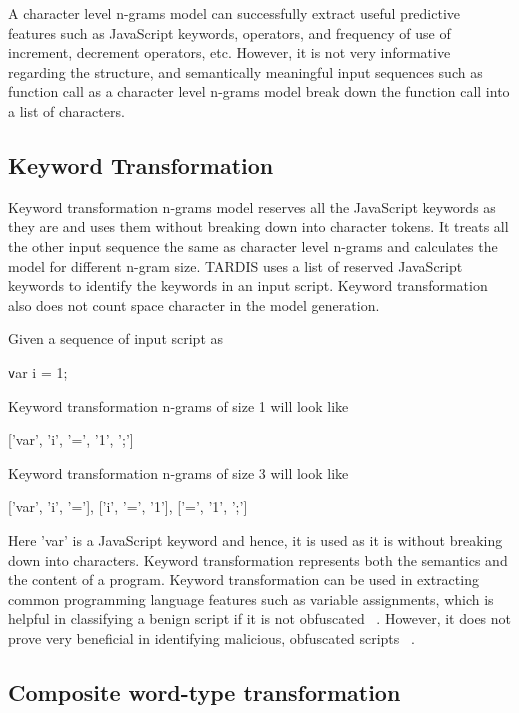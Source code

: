 A character level n-grams model can successfully extract useful predictive features such as JavaScript keywords, operators, and frequency of use of increment, decrement operators, etc. However, it is not very informative regarding the structure, and semantically meaningful input sequences such as function call as a character level n-grams model break down the function call into a list of characters.

\subsection{Keyword Transformation}

Keyword transformation n-grams model reserves all the JavaScript keywords as they are and uses them without breaking down into character tokens. It treats all the other input sequence the same as character level n-grams and calculates the model for different n-gram size. TARDIS uses a list of reserved JavaScript keywords to identify the keywords in an input script. Keyword transformation also does not count space character in the model generation. 

Given a sequence of input script as

\texttt var i = 1;

Keyword transformation n-grams of size 1 will look like 

['var', 'i', '=', '1', ';']

Keyword transformation n-grams of size 3 will look like

['var', 'i', '='], ['i', '=', '1'], ['=', '1', ';']

Here 'var' is a JavaScript keyword and hence, it is used as it is without breaking down into characters.  Keyword transformation represents both the semantics and the content of a program. Keyword transformation can be used in extracting common programming language features such as variable assignments, which is helpful in classifying a benign script if it is not obfuscated ~\cite{g1}. However, it does not prove very beneficial in identifying malicious, obfuscated scripts ~\cite{g2}.

\subsection{Composite word-type transformation}

